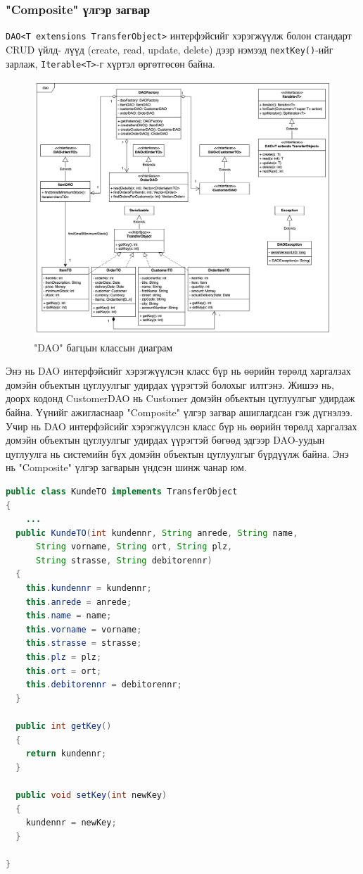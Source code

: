 \subsubsection{"Composite" үлгэр загвар}
\verb|DAO<T extensions TransferObject>| интерфэйсийг хэрэгжүүлж болон стандарт CRUD үйлд- лүүд (create, read, update, delete) дээр нэмээд \verb|nextKey()|-ийг зарлаж, \verb|Iterable<T>|-г хүртэл өргөтгөсөн байна.
\begin{figure}
	\centering
	\includegraphics[width=15cm]{images/diagram3.png}
	\caption{"DAO" багцын классын диаграм}
	\label{fig:diagram3}
\end{figure}
Энэ нь DAO интерфэйсийг хэрэгжүүлсэн класс бүр нь өөрийн төрөлд харгалзах домэйн объектын цуглуулгыг удирдах үүрэгтэй болохыг илтгэнэ. Жишээ нь, доорх кодонд CustomerDAO нь Customer домэйн объектын цуглуулгыг удирдаж байна. Үүнийг ажигласнаар "Composite" үлгэр загвар ашиглагдсан гэж дүгнэлээ. Учир нь DAO интерфэйсийг хэрэгжүүлсэн класс бүр нь өөрийн төрөлд харгалзах домэйн объектын цуглуулгыг удирдах үүрэгтэй бөгөөд эдгээр DAO-уудын цуглуулга нь системийн бүх домэйн объектын цуглуулгыг бүрдүүлж байна. Энэ нь "Composite" үлгэр загварын үндсэн шинж чанар юм.

\begin{lstlisting}[language=Java, caption=KundeTO класс, frame=single]
public class KundeTO implements TransferObject
{
	...
  public KundeTO(int kundennr, String anrede, String name,
      String vorname, String ort, String plz,
      String strasse, String debitorennr)
  {
    this.kundennr = kundennr;
    this.anrede = anrede;
    this.name = name;
    this.vorname = vorname;
    this.strasse = strasse;
    this.plz = plz;
    this.ort = ort;
    this.debitorennr = debitorennr;
  }

  public int getKey()
  {
    return kundennr;
  }

  public void setKey(int newKey)
  {
    kundennr = newKey;
  }

}
\end{lstlisting}

